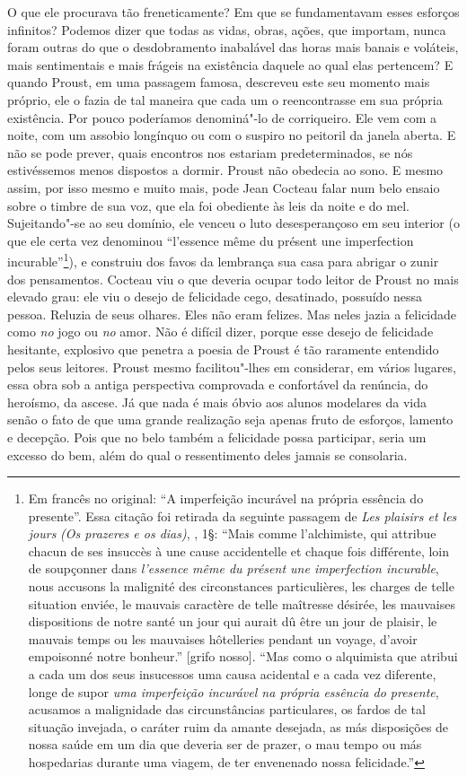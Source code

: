 O que ele procurava tão freneticamente? Em que se fundamentavam esses
esforços infinitos? Podemos dizer que todas as vidas, obras, ações, que
importam, nunca foram outras do que o desdobramento inabalável das horas
mais banais e voláteis, mais sentimentais e mais frágeis na existência
daquele ao qual elas pertencem? E quando Proust, em uma passagem famosa,
descreveu este seu momento mais próprio, ele o fazia de tal maneira que
cada um o reencontrasse em sua própria existência. Por pouco poderíamos
denominá"-lo de corriqueiro. Ele vem com a noite, com um assobio
longínquo ou com o suspiro no peitoril da janela aberta. E não se pode
prever, quais encontros nos estariam predeterminados, se nós
estivéssemos menos dispostos a dormir. Proust não obedecia ao sono. E
mesmo assim, por isso mesmo e muito mais, pode Jean Cocteau falar num
belo ensaio sobre o timbre de sua voz, que ela foi obediente às leis da
noite e do mel. Sujeitando"-se ao seu domínio, ele venceu o luto
desesperançoso em seu interior (o que ele certa vez denominou
``l'essence même du présent une imperfection incurable''\footnote{Em francês no original: ``A imperfeição incurável na própria essência
  do presente''. Essa citação foi retirada da seguinte passagem de
  \emph{Les plaisirs et les jours} \emph{(Os prazeres e os dias)}, ,
  1§: ``Mais comme l'alchimiste, qui attribue chacun de ses insuccès à
  une cause accidentelle et chaque fois différente, loin de soupçonner
  dans \emph{l'essence même du présent une imperfection incurable}, nous
  accusons la malignité des circonstances particulières, les charges de
  telle situation enviée, le mauvais caractère de telle maîtresse
  désirée, les mauvaises dispositions de notre santé un jour qui aurait
  dû être un jour de plaisir, le mauvais temps ou les mauvaises
  hôtelleries pendant un voyage, d'avoir empoisonné notre bonheur.''
  {[}grifo nosso{]}. ``Mas como o alquimista que atribui a cada um dos
  seus insucessos uma causa acidental e a cada vez diferente, longe de
  supor \emph{uma imperfeição incurável na própria essência do
  presente}, acusamos a malignidade das circunstâncias particulares, os
  fardos de tal situação invejada, o caráter ruim da amante desejada, as
  más disposições de nossa saúde em um dia que deveria ser de prazer, o
  mau tempo ou más hospedarias durante uma viagem, de ter envenenado
  nossa felicidade.'' \versal{[N. T.]}}), e construiu dos favos da lembrança sua casa
para abrigar o zunir dos pensamentos. Cocteau viu o que deveria ocupar
todo leitor de Proust no mais elevado grau: ele viu o desejo de
felicidade cego, desatinado, possuído nessa pessoa. Reluzia de seus
olhares. Eles não eram felizes. Mas neles jazia a felicidade como
\emph{no} jogo ou \emph{no} amor. Não é difícil dizer, porque esse
desejo de felicidade hesitante, explosivo que penetra a poesia de
Proust é tão raramente entendido pelos seus leitores. Proust mesmo
facilitou"-lhes em considerar, em vários lugares, essa obra sob a
antiga perspectiva comprovada e confortável da renúncia, do heroísmo, da
ascese. Já que nada é mais óbvio aos alunos modelares da vida senão o
fato de que uma grande realização seja apenas fruto de esforços, lamento
e decepção. Pois que no belo também a felicidade possa participar, seria
um excesso do bem, além do qual o ressentimento deles jamais se
consolaria.

